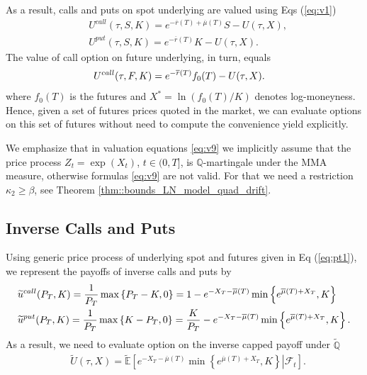 \documentclass[11pt,a4paper] {article}
\begin{document}
As a result, calls and puts on spot underlying are valued using Eqs (\ref{eq:v1})
\begin{equation} \label{eq:v9}
\begin{split}
  & U^{call}(\tau, S,K)  = e^{-\overline{r}(T)+\overline{\mu}(T)}S- U(\tau, X), \\
	& U^{put}(\tau, S,K)  = e^{-\overline{r}(T)} K - U(\tau, X).
\end{split} 
\end{equation}
The value of call option on future underlying, in turn, equals
\begin{equation} \label{eq:v9a}
\begin{split}
  & U^{call}(\tau, F,K) =  e^{-\overline{r}(T)}f_{0}(T)- U(\tau, X).\vspace*{-1.0\baselineskip}
\end{split} 
\end{equation}
where $f_{0}(T)$ is the futures and $X^{*}=\ln(f_{0}(T)/K)$ denotes log-moneyness. Hence, given a set of futures prices quoted in the market, we can evaluate options on this set of futures without need to compute the convenience yield explicitly.

We emphasize that in valuation equations \eqref{eq:v9} we implicitly assume that the price process $Z_t=\exp(X_t)$, $t \in (0, T]$, is $\mathbb{Q}$-martingale under the MMA measure, otherwise formulas \eqref{eq:v9} are not valid. For that we need a restriction $\kappa_2\ge \beta$, see Theorem \ref{thm::bounds_LN_model_quad_drift}. 


\subsection{Inverse Calls and Puts}

Using generic price process of underlying spot and futures given in Eq (\ref{eq:pt1}), we represent the payoffs of inverse calls and puts by
\begin{equation}\label{eq:io1}
\begin{split}
  & \widetilde{u}^{call}(P_{T},K) = \frac{1}{P_{T}}\max\left\{P_{T}-K, 0\right\}=1-e^{-X_{T}-\overline{\mu}(T)}\min\left\{e^{\overline{\mu}(T)+X_{T}},K\right\}\\
	& \widetilde{u}^{put}(P_{T},K) = \frac{1}{P_{T}}\max\left\{K-P_T, 0\right\} = \frac{K}{P_{T}}  - e^{-X_{T}-\overline{\mu}(T)}\min\left\{e^{\overline{\mu}(T)+X_{T}},K\right\}.\vspace*{-1.0\baselineskip}
\end{split} 
\end{equation}
As a result, we need to evaluate option on the inverse capped payoff under $\tilde{\mathbb{Q}}$
\begin{equation} \label{eq:io2}
\begin{split}
  & \tilde{U}(\tau, X) = \tilde{\mathbb{E}}\left[\left.e^{-X_{T}-\overline{\mu}(T)} \min\left\{e^{\overline{\mu}(T)+X_{T}},K\right\}\right|\mathcal{F}_{t}\right].
\end{split} 
\end{equation}
\end{document}

